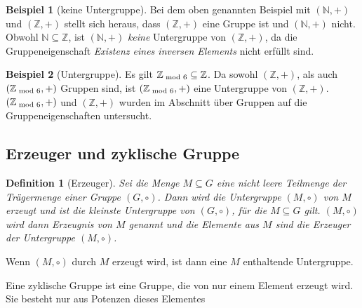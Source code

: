 \documentclass[12pt,a4paper, usenames, dvipsnames]{article}
\theoremstyle{mystyle}
\newtheorem{definition}{Definition}
\theoremstyle{definition}
\newtheorem{bsp}{Beispiel}[definition]
\begin{document}
\begin{bsp}[keine Untergruppe]

Bei dem oben genannten Beispiel mit $(\mathbb{N},+)$ und $(\mathbb{Z},+)$ stellt sich heraus, dass $(\mathbb{Z},+)$ eine Gruppe ist und $(\mathbb{N},+)$ nicht. Obwohl $\mathbb{N \subseteq \mathbb{Z}}$, ist $(\mathbb{N},+)$ \textit{keine} Untergruppe von $(\mathbb{Z},+)$, da die Gruppeneigenschaft \textit{Existenz eines inversen Elements} nicht erfüllt sind.

\end{bsp}
\begin{bsp}[Untergruppe]

Es gilt $\mathbb{Z}_{\hspace*{-0.3em}\mod 6} \subseteq \mathbb{Z}$. Da sowohl $(\mathbb{Z},+)$, als auch $(\mathbb{Z}_{\hspace*{-0.3em}\mod 6}, +)$ Gruppen sind, ist $(\mathbb{Z}_{\hspace*{-0.3em}\mod 6}, +)$ eine Untergruppe von $(\mathbb{Z},+)$. $(\mathbb{Z}_{\hspace*{-0.3em}\mod 6}, +)$ und $(\mathbb{Z},+)$ wurden im Abschnitt über Gruppen auf die Gruppeneigenschaften untersucht.

\end{bsp}

%
%
%
%
%
%
%
%
%
%

\subsection{Erzeuger und zyklische Gruppe} 
\label{Abschnitt_Erzeuger}


\begin{definition}[Erzeuger]
Sei die Menge $M \subseteq G$ eine nicht leere Teilmenge der Trägermenge einer Gruppe $(G, \circ)$. 
Dann wird die Untergruppe $(M, \circ)$ von $M$ erzeugt und ist die kleinste Untergruppe von $(G, \circ)$, für die $M \subseteq G$ gilt.
$(M, \circ)$ wird dann Erzeugnis von $M$ genannt und die Elemente aus $M$ sind die Erzeuger der Untergruppe $(M, \circ)$.
\end{definition}

Wenn $(M, \circ)$ durch $M$ erzeugt wird, ist dann eine $M$ enthaltende Untergruppe.

Eine zyklische Gruppe ist eine Gruppe, die von nur einem Element erzeugt wird. Sie besteht nur aus Potenzen dieses Elementes
\end{document}
